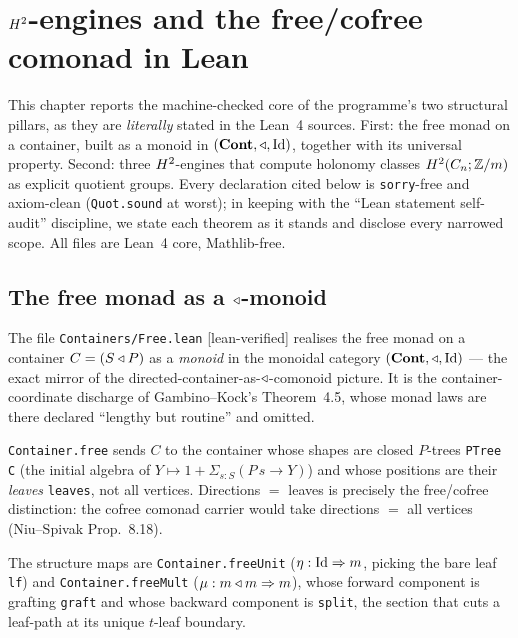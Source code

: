 \chapter{$H^2$-engines and the free/cofree comonad in Lean}
\label{ch:h2engines}

This chapter reports the machine-checked core of the programme's two structural pillars, as they are \emph{literally} stated in the Lean~4 sources. First: the free monad on a container, built as a monoid in $(\mathbf{Cont},\triangleleft,\mathrm{Id})$, together with its universal property. Second: three $H^2$-engines that compute holonomy classes $H^2(C_n;\mathbb{Z}/m)$ as explicit quotient groups. Every declaration cited below is \texttt{sorry}-free and axiom-clean (\texttt{Quot.sound} at worst); in keeping with the ``Lean statement self-audit'' discipline, we state each theorem as it stands and disclose every narrowed scope. All files are Lean~4 core, Mathlib-free.

\section{The free monad as a $\triangleleft$-monoid}
\label{sec:free-monoid}

The file \texttt{Containers/Free.lean} [lean-verified] realises the free monad on a container $C=(S\triangleleft P)$ as a \emph{monoid} in the monoidal category $(\mathbf{Cont},\triangleleft,\mathrm{Id})$ --- the exact mirror of the directed-container-as-$\triangleleft$-comonoid picture. It is the container-coordinate discharge of Gambino--Kock's Theorem~4.5, whose monad laws are there declared ``lengthy but routine'' and omitted.

\begin{definition}
\texttt{Container.free} sends $C$ to the container whose shapes are closed $P$-trees \texttt{PTree C} (the initial algebra of $Y\mapsto 1+\Sigma_{s:S}(P\,s\to Y)$) and whose positions are their \emph{leaves} \texttt{leaves}, not all vertices. Directions $=$ leaves is precisely the free/cofree distinction: the cofree comonad carrier would take directions $=$ all vertices (Niu--Spivak Prop.~8.18).
\end{definition}

The structure maps are \texttt{Container.freeUnit} ($\eta:\mathrm{Id}\Rightarrow m$, picking the bare leaf \texttt{lf}) and \texttt{Container.freeMult} ($\mu:m\triangleleft m\Rightarrow m$), whose forward component is grafting \texttt{graft} and whose backward component is \texttt{split}, the section that cuts a leaf-path at its unique $t$-leaf boundary.


